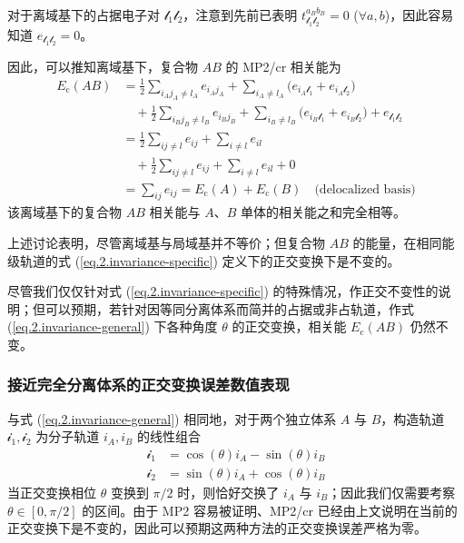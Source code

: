 对于离域基下的占据电子对 $\mathscr{l}_1 \mathscr{l}_2$，注意到先前已表明 $t_{\mathscr{l}_1 \mathscr{l}_2}^{a_B b_B} = 0$ ($\forall a, b$)，因此容易知道 $e_{\mathscr{l}_1 \mathscr{l}_2} = 0$。

因此，可以推知离域基下，复合物 $AB$ 的 MP2/cr 相关能为
\begin{align*}
  E_\mathrm{c} (AB) &= \frac{1}{2} \sum_{i_A j_A \neq l_A} e_{i_A j_A} + \sum_{i_A \neq l_A} \big( e_{i_A \mathscr{l}_1} + e_{i_A \mathscr{l}_2} \big) \\
  &\quad + \frac{1}{2} \sum_{i_B j_B \neq l_B} e_{i_B j_B} + \sum_{i_B \neq l_B} \big( e_{i_B \mathscr{l}_1} + e_{i_B \mathscr{l}_2} \big) + e_{\mathscr{l}_1 \mathscr{l}_2} \\
  &= \frac{1}{2} \sum_{ij \neq l} e_{ij} + \sum_{i \neq l} e_{il} \\
  &\quad + \frac{1}{2} \sum_{ij \neq l} e_{ij} + \sum_{i \neq l} e_{il} + 0 \\
  &= \sum_{ij} e_{ij} = E_\mathrm{c} (A) + E_\mathrm{c} (B) \quad \text{(delocalized basis)}
\end{align*}
该离域基下的复合物 $AB$ 相关能与 $A$、$B$ 单体的相关能之和完全相等。

上述讨论表明，尽管离域基与局域基并不等价；但复合物 $AB$ 的能量，在相同能级轨道的式 (\ref{eq.2.invariance-specific}) 定义下的正交变换下是不变的。

尽管我们仅仅针对式 (\ref{eq.2.invariance-specific}) 的特殊情况，作正交不变性的说明；但可以预期，若针对因等同分离体系而简并的占据或非占轨道，作式 (\ref{eq.2.invariance-general}) 下各种角度 $\theta$ 的正交变换，相关能 $E_\mathrm{c} (AB)$ 仍然不变。

\subsubsection{接近完全分离体系的正交变换误差数值表现}

与式 (\ref{eq.2.invariance-general}) 相同地，对于两个独立体系 $A$ 与 $B$，构造轨道 $\mathscr{i}_1, \mathscr{i}_2$ 为分子轨道 $i_A, i_B$ 的线性组合
\begin{align*}
  \mathscr{i}_1 &= \cos(\theta) i_A - \sin(\theta) i_B \\
  \mathscr{i}_2 &= \sin(\theta) i_A + \cos(\theta) i_B
\end{align*}
当正交变换相位 $\theta$ 变换到 $\pi/2$ 时，则恰好交换了 $i_A$ 与 $i_B$；因此我们仅需要考察 $\theta \in [0, \pi/2]$ 的区间。由于 MP2 容易被证明、MP2/cr 已经由上文说明在当前的正交变换下是不变的，因此可以预期这两种方法的正交变换误差严格为零。

